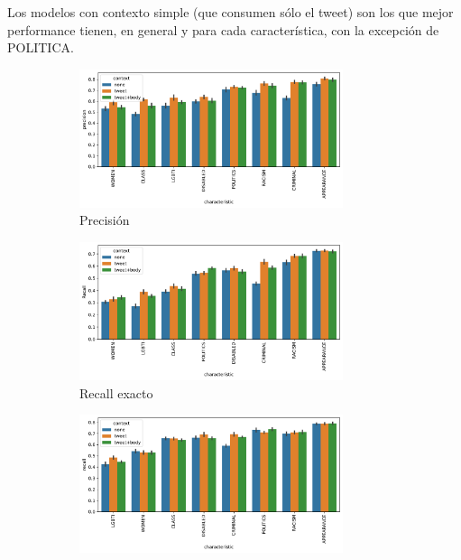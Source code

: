 Los modelos con contexto simple (que consumen sólo el tweet) son los que mejor performance tienen, en general y para cada característica, con la excepción de POLITICA.





\begin{figure}[t]
    \centering
    \small
    \begin{subfigure}[b]{\textwidth}
        \centering
        \includegraphics[width=0.85\textwidth]{img/context_classification/precision_barplot.pdf}
        \caption{Precisión}
    \end{subfigure}
    \begin{subfigure}[b]{\textwidth}
        \centering
        \includegraphics[width=0.85\textwidth]{img/context_classification/exact_recall_barplot.pdf}
        \caption{Recall exacto}
        \label{subfig:exact_recall}
    \end{subfigure}
    \begin{subfigure}[b]{\textwidth}
        \centering
        \includegraphics[width=0.85\textwidth]{img/context_classification/hate_recall_barplot.pdf}

\end{subfigure}
\end{figure}
